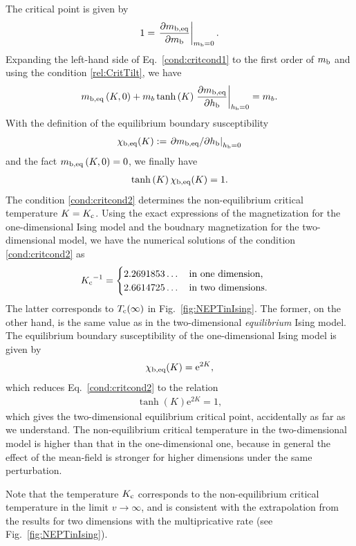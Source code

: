 The critical point is given by
\begin{align}
1=\left.\frac{\partial m_{\rm b,eq}}{\partial m_{\rm b}}\right|_{m_{\rm b}=0}.\label{rel:CritTilt}
\end{align}
Expanding the left-hand side of Eq.~\eqref{cond:critcond1} to the first order of $m_{\rm b}$ and using the condition \eqref{rel:CritTilt}, we have
\begin{align}
m_{\rm b,eq}\left(K,0\right) + m_{b}\tanh\left(K\right)\left.\frac{\partial m_{\rm b,eq}}{\partial h_{\rm b}}\right|_{h_{\rm b}=0} = m_{b}.
\end{align}
With the definition of the equilibrium boundary susceptibility
\begin{align}
\chi_{\rm b, eq}(K):=\left.\partial m_{\rm b,eq}/\partial h_{\rm b}\right|_{h_{\rm b}=0}
\end{align}
and the fact $m_{\rm b,eq}\left(K,0\right)=0$, we finally have
\begin{align}
\tanh \left(K\right)\chi_{\rm b, eq}(K) = 1.\label{cond:critcond2}
\end{align}
The condition \eqref{cond:critcond2} determines the non-equilibrium critical temperature $K=K_{\rm c}$. Using the exact expressions of the magnetization for the one-dimensional Ising model and the boudnary magnetization for the two-dimensional model, we have the numerical solutions of the condition \eqref{cond:critcond2} as
\begin{align}
{K_{\rm c}}^{-1} = \begin{cases}
2.2691853\dots\quad\text{in one dimension,}\\
2.6614725\dots\quad\text{in two dimensions.}
\end{cases}
\end{align}
The latter corresponds to $T_{\rm c}(\infty)$ in Fig.~\ref{fig:NEPTinIsing}. The former, on the other hand, is the same value as in the two-dimensional \textit{equilibrium} Ising model. The equilibrium boundary susceptibility of the one-dimensional Ising model is given by
\begin{align}
\chi_{\rm b, eq}(K) = \mathrm{e}^{2K},
\end{align}
which reduces Eq.~\eqref{cond:critcond2} to the relation
\begin{align}
\tanh \left(K\right)\mathrm{e}^{2K} = 1,
\end{align}
which gives the two-dimensional equilibrium critical point, accidentally as far as we understand. The non-equilibrium critical temperature in the two-dimensional model is higher than that in the one-dimensional one, because in general the effect of the mean-field is stronger for higher dimensions under the same perturbation.

Note that the temperature $K_{\rm c}$ corresponds to the non-equilibrium critical temperature in the limit $v\to\infty$, and is consistent with the extrapolation from the results for two dimensions with the multipricative rate (see Fig.~\ref{fig:NEPTinIsing}).

